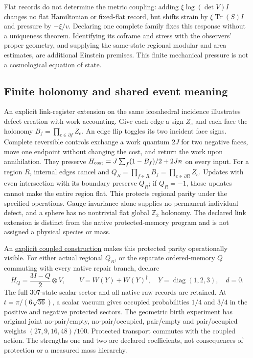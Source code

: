 Flat records do not determine the metric coupling: adding
$\xi\log(\det V)I$ changes no flat Hamiltonian or fixed-flat record,
but shifts strain by $\xi\operatorname{Tr}(S)I$ and pressure by
$-\xi/v$. Declaring one complete family fixes this response without
a uniqueness theorem. Identifying its coframe and stress with the
observers' proper geometry, and supplying the same-state regional
modular and area estimates, are additional Einstein premises. This
finite mechanical pressure is not a cosmological equation of state.

\subsection{Finite holonomy and shared event meaning}

An explicit link-register extension on the same icosahedral incidence
illustrates defect creation with work accounting. Give each edge a sign
$Z_e$ and each face the holonomy $B_f=\prod_{e\in\partial f}Z_e$.
An edge flip toggles its two incident face signs. Complete reversible
controls exchange a work quantum $2J$ for two negative faces, move one
endpoint without changing the cost, and return the work upon annihilation.
They preserve $H_{\rm cost}=J\sum_f(1-B_f)/2+2Jn$ on every input.
For a region $R$, internal edges cancel and
$Q_R=\prod_{f\in R}B_f=\prod_{e\in\partial R}Z_e$.
Updates with even intersection with its boundary preserve $Q_R$; if
$Q_R=-1$, those updates cannot make the entire region flat.
This protects regional parity under the specified operations. Gauge
invariance alone supplies no permanent individual defect, and a sphere
has no nontrivial flat global $\mathbb Z_2$ holonomy. The declared link
extension is distinct from the native protected-memory program and is
not assigned a physical species or mass.

An \href{https://github.com/FloatingPragma/observer-patch-holography/blob/main/model/particle_defect_attachment/PROOF.md}{explicit coupled construction}
makes this protected parity operationally visible. For either actual
regional $Q_R$, or the separate ordered-memory $Q$ commuting with every
native repair branch, declare
\[
 H_Q=\frac{3I-Q}{2}\otimes V,\qquad
 V=W(Y)+W(Y)^\dagger,\quad Y=\operatorname{diag}(1,2,3),\quad d=0.
\]
The full 307-state scalar sector and all native raw records are retained.
At $t=\pi/(6\sqrt{56})$, a scalar vacuum gives occupied probabilities
$1/4$ and $3/4$ in the positive and negative protected sectors. The
geometric birth experiment has original joint no-pair/empty,
no-pair/occupied, pair/empty and pair/occupied weights
$(27,9,16,48)/100$. Protected transport commutes with the coupled action.
The strengths one and two are declared coefficients, not consequences
of protection or a measured mass hierarchy.

